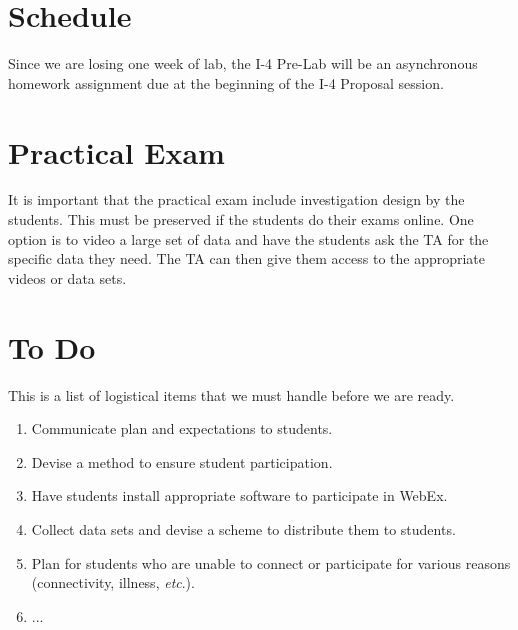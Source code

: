 \documentclass[11pt, oneside]{article}
\begin{document}
\section{Schedule}

Since we are losing one week of lab, the I-4 Pre-Lab will be an asynchronous homework assignment due at the beginning of the I-4 Proposal session.

\section{Practical Exam}

It is important that the practical exam include investigation design by the students.  This must be preserved if the students do their exams online.  One option is to video a large set of data and have the students ask the TA for the specific data they need.  The TA can then give them access to the appropriate videos or data sets.

\section{To Do}
This is a list of logistical items that we must handle before we are ready.

\begin{enumerate}
\item Communicate plan and expectations to students.
\item Devise a method to ensure student participation.
\item Have students install appropriate software to participate in WebEx.
\item Collect data sets and devise a scheme to distribute them to students.
\item Plan for students who are unable to connect or participate for various reasons (connectivity, illness, \emph{etc}.).
\item ...
\end{enumerate}
\end{document}
